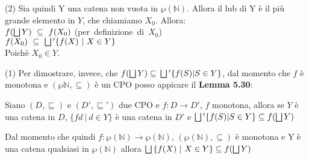 {    (2) Sia quindi Y una catena non vuota in $\wp{(\mathbb{N})}$. Allora il lub
    di Y è il più grande elemento in $Y$, che chiamiamo $X_0$. Allora:\\
    \hspace*{1.5cm}$f(\bigsqcup{}Y)~\subseteq~f(X_0)$ (per~definizione~di~$X_0$)\\
    \hspace*{1.5cm}$f(X_0)~\subseteq~\bigsqcup{}'\{f(X)~|~X\in{}Y\}$ \\
    Poichè $X_0\in{}Y$.

    (1) Per dimostrare, invece, che $f(\bigsqcup{}Y) \subseteq{} 
    \bigsqcup{}' \{f(S) | S \in{}Y\}$, dal momento che $f$ è monotona e 
    $(\wp{\mathbb{N}}, \subseteq{})$ è un CPO posso appicare il 
    \textbf{Lemma 5.30}:\\
    \begin{customlem}{5.30}
    Siano $(D, \sqsubseteq)$ e $(D', \sqsubseteq{}')$ due CPO e 
    $f:D\rightarrow{}D'$, $f$ monotona, allora se $Y$ è una catena in $D$, 
    $\{fd~|~d\in{}Y\}$ è una catena in $D'$ e $\bigsqcup{}' \{f(S) | S \in{}Y\} 
    \subseteq f(\bigsqcup{}Y)$
    \end{customlem}
    Dal momento che quindi $f:\wp{(\mathbb{N})}\rightarrow{}\wp{(\mathbb{N})}$,
    $(\wp{(\mathbb{N})}, \subseteq)$ è monotona e Y è una catena qualsiasi in 
    $\wp{(\mathbb{N})}$ allora $\bigsqcup{}\{f(X)~|~X\in{}Y\}\subseteq{}f(\bigsqcup{}Y)$
%
	
}
\newpage